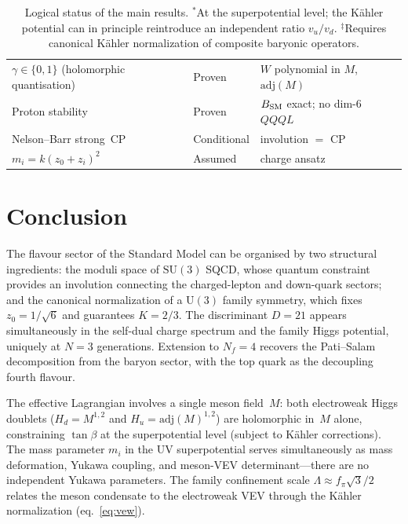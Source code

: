 \documentclass[12pt,a4paper]{article}
\newcommand{\SU}{\mathrm{SU}}
\newcommand{\UU}{\mathrm{U}}
\newcommand{\Nf}{N_f}
\newcommand{\adj}{\mathrm{adj}}
\begin{document}
\begin{table}[ht]
\begin{tabular}{lll}
$\gamma \in \{0,1\}$ (holomorphic quantisation) & Proven & $W$ polynomial in $M$, $\adj(M)$ \\
Proton stability & Proven & $B_{\rm SM}$ exact; no dim-6 $QQQL$ \\
Nelson--Barr strong~CP & Conditional & involution $=$ CP \\
$m_i = k(z_0{+}z_i)^2$ & Assumed & charge ansatz \\
\hline
\end{tabular}
\caption{Logical status of the main results.
${}^*$At the superpotential level; the K\"ahler potential
  can in principle reintroduce an independent ratio
  $v_u/v_d$.
${}^\ddagger$Requires canonical K\"ahler normalization
  of composite baryonic operators.}
\label{tab:status}
\end{table}


\section{Conclusion}
\label{sec:conclusion}

The flavour sector of the Standard Model can be organised by two
structural ingredients: the moduli space of $\SU(3)$ SQCD, whose
quantum constraint provides an involution connecting the charged-lepton
and down-quark sectors; and the canonical normalization of a $\UU(3)$
family symmetry, which fixes $z_0 = 1/\sqrt{6}$ and guarantees
$K = 2/3$. The discriminant $D = 21$ appears simultaneously in the
self-dual charge spectrum and the family Higgs potential, uniquely at
$N = 3$ generations. Extension to $\Nf = 4$ recovers the Pati--Salam
decomposition from the baryon sector, with the top quark as the
decoupling fourth flavour.

The effective Lagrangian involves a single meson field~$M$: both
electroweak Higgs doublets ($H_d = M^{1,2}$ and $H_u = \adj(M)^{1,2}$)
are holomorphic in~$M$ alone, constraining $\tan\beta$ at the
superpotential level (subject to K\"ahler corrections).
The mass parameter $m_i$ in the UV superpotential serves
simultaneously as mass deformation, Yukawa coupling, and meson-VEV
determinant---there are no independent Yukawa parameters. The family
confinement scale $\Lambda \approx f_\pi\sqrt{3}/2$ relates the
meson condensate to the electroweak VEV through the K\"ahler
normalization (eq.~\ref{eq:vew}).
\end{document}

